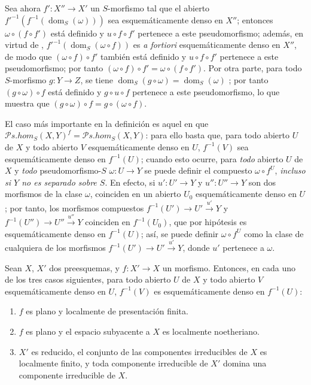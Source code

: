 \begin{env}[20.3.3]
\label{IV.20.3.3}
Sea ahora $f':X''\to X'$ un $S$-morfismo tal que el abierto $f'^{-1}(f^{-1}(\operatorname{dom}_S(\omega)))$ sea esquemáticamente denso en $X''$; entonces $\omega\circ(f\circ f')$ está definido y $u\circ f\circ f'$ pertenece a este pseudomorfismo; además, en virtud de , $f'^{-1}(\operatorname{dom}_S(\omega\circ f))$ es \emph{a fortiori} esquemáticamente denso en $X''$, de modo que $(\omega\circ f)\circ f'$ también está definido y $u\circ f\circ f'$ pertenece a este pseudomorfismo; por tanto $(\omega\circ f)\circ f'=\omega\circ(f\circ f')$.
Por otra parte, para todo $S$-morfismo $g:Y\to Z$, se tiene $\operatorname{dom}_S(g\circ\omega)=\operatorname{dom}_S(\omega)$ ; por tanto $(g\circ\omega)\circ f$ está definido y $g\circ u\circ f$ pertenece a este pseudomorfismo, lo que muestra que $(g\circ\omega)\circ f=g\circ(\omega\circ f)$.
\end{env}

\begin{env}[20.3.4]
\label{IV.20.3.4}
El caso más importante en la definición  es aquel en que $\mathscr{P}\!s.\!\mathit{hom}_S(X,Y)^f=\mathscr{P}\!s.\!\mathit{hom}_S(X,Y)$: para ello basta que, para todo abierto $U$ de $X$ y todo abierto $V$ esquemáticamente denso en $U$, $f^{-1}(V)$ sea esquemáticamente denso en $f^{-1}(U)$; cuando esto ocurre, para \emph{todo} abierto $U$ de $X$ y \emph{todo} pseudomorfismo-$S$ $\omega:U\to Y$ se puede definir el compuesto $\omega\circ f^U$, \emph{incluso si $Y$ no es separado sobre $S$}.
En efecto, si $u':U'\to Y$ y $u'':U''\to Y$ son dos morfismos de la clase $\omega$, coinciden en un abierto $U_0$ esquemáticamente denso en $U$; por tanto, los morfismos compuestos $f^{-1}(U')\to U'\xrightarrow{u'}Y$ y $f^{-1}(U'')\to U''\xrightarrow{u''}Y$ coinciden en $f^{-1}(U_0)$, que por hipótesis es esquemáticamente denso en $f^{-1}(U)$; así, se puede definir $\omega\circ f^U$ como la clase de cualquiera de los morfismos $f^{-1}(U')\to U'\xrightarrow{u'}Y$, donde $u'$ pertenece a $\omega$.
\end{env}

\begin{proposition}[20.3.5]
\label{IV.20.3.5}
Sean $X$, $X'$ dos preesquemas, y $f:X'\to X$ un morfismo.
Entonces, en cada uno de los tres casos siguientes, para todo abierto $U$ de $X$ y todo abierto $V$ esquemáticamente denso en $U$, $f^{-1}(V)$ es esquemáticamente denso en $f^{-1}(U)$:
\begin{enumerate}[label=\emph{(\roman*)}]
  \item $f$ es plano y localmente de presentación finita.
  \item $f$ es plano y el espacio subyacente a $X$ es localmente noetheriano.
  \item $X'$ es reducido, el conjunto de las componentes irreducibles de $X$ es localmente finito, y toda componente irreducible de $X'$ domina una componente irreducible de $X$.
\end{enumerate}
\end{proposition}

